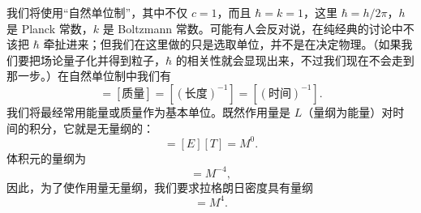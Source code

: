 我们将使用“自然单位制”，其中不仅 $c=1$，而且 $\hbar=k=1$，这里 $\hbar=h/2\pi$，$h$ 是 Planck 常数，$k$ 是 Boltzmann 常数。可能有人会反对说，在纯经典的讨论中不该把 $\hbar$ 牵扯进来；但我们在这里做的只是选取单位，并不是在决定物理。（如果我们要把场论量子化并得到粒子，$\hbar$ 的相关性就会显现出来，不过我们现在不会走到那一步。）在自然单位制中我们有
\begin{equation*}
[\text{能量}] = [\text{质量}] = [(\text{长度})^{-1}] = [(\text{时间})^{-1}].
\tag{1.133}
\end{equation*}
我们将最经常用能量或质量作为基本单位。既然作用量是 $L$（量纲为能量）对时间的积分，它就是无量纲的：
\begin{equation*}
[S] = [E][T] = M^{0}.
\tag{1.134}
\end{equation*}
体积元的量纲为
\begin{equation*}
[d^{4}x] = M^{-4},
\tag{1.135}
\end{equation*}
因此，为了使作用量无量纲，我们要求拉格朗日密度具有量纲
\begin{equation*}
[\mathcal{L}] = M^{4}.
\tag{1.136}
\end{equation*}

